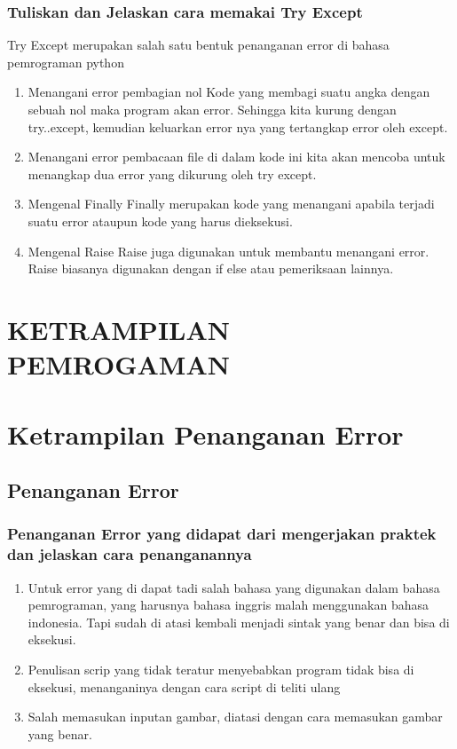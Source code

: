 \subsubsection{Tuliskan dan Jelaskan cara memakai Try Except}
Try Except merupakan salah satu bentuk penanganan error di bahasa pemrograman python
\begin{enumerate}
\item Menangani error pembagian nol
\hfill \break
Kode yang membagi suatu angka dengan sebuah nol maka program akan error. Sehingga kita kurung dengan try..except, kemudian keluarkan error nya yang tertangkap error oleh except.
\item Menangani error pembacaan file
\hfill \break
di dalam kode ini kita akan mencoba untuk  menangkap dua error yang dikurung oleh try except.
\item Mengenal Finally
\hfill \break
Finally merupakan kode yang menangani apabila terjadi suatu error ataupun kode yang harus dieksekusi.
\item Mengenal Raise
\hfill \break
Raise juga digunakan untuk membantu menangani error. Raise biasanya digunakan dengan if else atau pemeriksaan lainnya.
\end{enumerate}
\section{KETRAMPILAN PEMROGAMAN}











\hfill\break
\section{Ketrampilan Penanganan Error}

\subsection{Penanganan Error}
\subsubsection{Penanganan Error yang didapat dari mengerjakan praktek dan jelaskan cara penanganannya}
\begin{enumerate}
\item Untuk error yang di dapat tadi salah bahasa yang digunakan dalam bahasa pemrograman, yang harusnya bahasa inggris malah menggunakan bahasa indonesia. Tapi sudah di atasi kembali menjadi sintak yang benar dan bisa di eksekusi.
\item Penulisan scrip yang tidak teratur menyebabkan program tidak bisa di eksekusi, menanganinya dengan cara script di teliti ulang
\item Salah memasukan inputan gambar, diatasi dengan cara memasukan gambar yang benar.
\end{enumerate}

